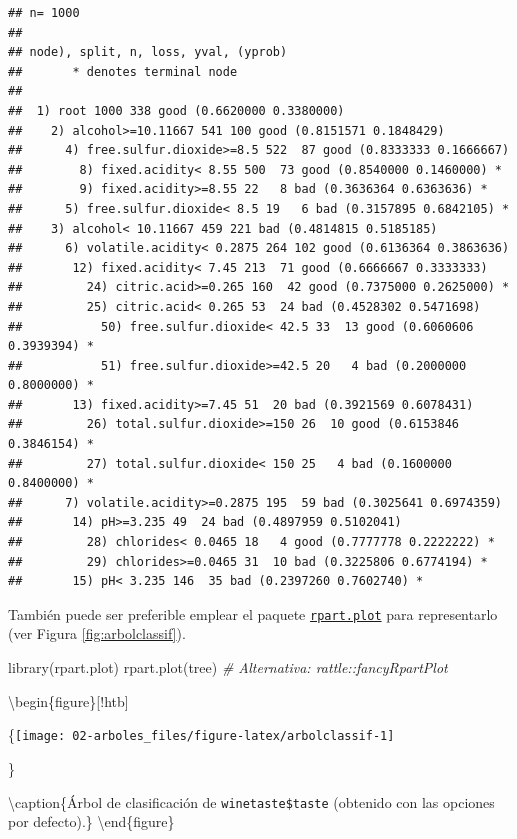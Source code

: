 \documentclass[
  spanish,
]{book}
\newenvironment{Shaded}{\begin{snugshade}}{\end{snugshade}}
\newcommand{\CommentTok}[1]{\textcolor[rgb]{0.56,0.35,0.01}{\textit{#1}}}
\newcommand{\FunctionTok}[1]{\textcolor[rgb]{0.00,0.00,0.00}{#1}}
\newcommand{\NormalTok}[1]{#1}
\theoremstyle{break}
\theoremstyle{definition}
\theoremstyle{definition}
\theoremstyle{definition}
\theoremstyle{definition}
\theoremstyle{remark}
\begin{document}
\begin{verbatim}
## n= 1000 
## 
## node), split, n, loss, yval, (yprob)
##       * denotes terminal node
## 
##  1) root 1000 338 good (0.6620000 0.3380000)  
##    2) alcohol>=10.11667 541 100 good (0.8151571 0.1848429)  
##      4) free.sulfur.dioxide>=8.5 522  87 good (0.8333333 0.1666667)  
##        8) fixed.acidity< 8.55 500  73 good (0.8540000 0.1460000) *
##        9) fixed.acidity>=8.55 22   8 bad (0.3636364 0.6363636) *
##      5) free.sulfur.dioxide< 8.5 19   6 bad (0.3157895 0.6842105) *
##    3) alcohol< 10.11667 459 221 bad (0.4814815 0.5185185)  
##      6) volatile.acidity< 0.2875 264 102 good (0.6136364 0.3863636)  
##       12) fixed.acidity< 7.45 213  71 good (0.6666667 0.3333333)  
##         24) citric.acid>=0.265 160  42 good (0.7375000 0.2625000) *
##         25) citric.acid< 0.265 53  24 bad (0.4528302 0.5471698)  
##           50) free.sulfur.dioxide< 42.5 33  13 good (0.6060606 0.3939394) *
##           51) free.sulfur.dioxide>=42.5 20   4 bad (0.2000000 0.8000000) *
##       13) fixed.acidity>=7.45 51  20 bad (0.3921569 0.6078431)  
##         26) total.sulfur.dioxide>=150 26  10 good (0.6153846 0.3846154) *
##         27) total.sulfur.dioxide< 150 25   4 bad (0.1600000 0.8400000) *
##      7) volatile.acidity>=0.2875 195  59 bad (0.3025641 0.6974359)  
##       14) pH>=3.235 49  24 bad (0.4897959 0.5102041)  
##         28) chlorides< 0.0465 18   4 good (0.7777778 0.2222222) *
##         29) chlorides>=0.0465 31  10 bad (0.3225806 0.6774194) *
##       15) pH< 3.235 146  35 bad (0.2397260 0.7602740) *
\end{verbatim}

También puede ser preferible emplear el paquete \href{https://CRAN.R-project.org/package=rpart.plot}{\texttt{rpart.plot}} para representarlo (ver Figura \ref{fig:arbolclassif}).

\begin{Shaded}
\begin{Highlighting}[]
\FunctionTok{library}\NormalTok{(rpart.plot)}
\FunctionTok{rpart.plot}\NormalTok{(tree) }\CommentTok{\# Alternativa: rattle::fancyRpartPlot}
\end{Highlighting}
\end{Shaded}

\textbackslash begin\{figure\}{[}!htb{]}

\{\centering \texttt{[image: 02-arboles\_files/figure-latex/arbolclassif-1]}

\}

\textbackslash caption\{Árbol de clasificación de \texttt{winetaste\$taste} (obtenido con las opciones por defecto).\}\label{fig:arbolclassif}
\textbackslash end\{figure\}
\end{document}
